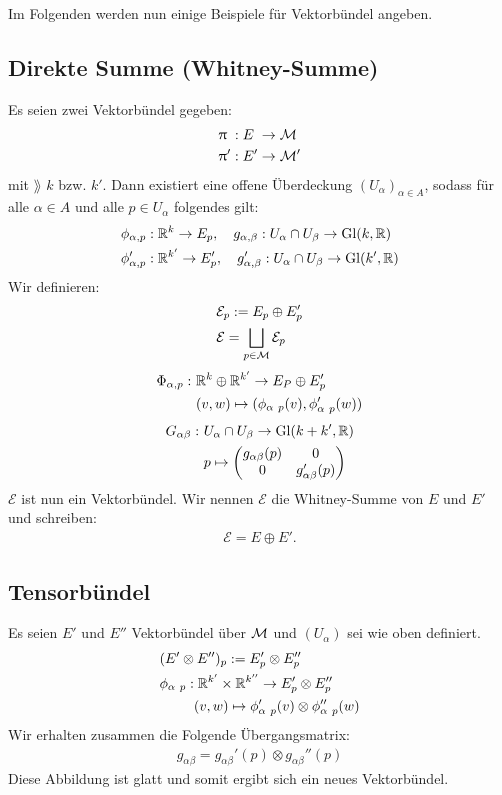 Im Folgenden werden nun einige Beispiele für Vektorbündel angeben.
\subsection{Direkte Summe (Whitney-Summe)}
Es seien zwei Vektorbündel gegeben:
\begin{align*}
\uppi\phantom{'} : E\phantom{'} &\to \mathcal{M}\phantom{'} \\
\uppi ' : E' &\to \mathcal{M} '
\end{align*}
mit $\rang$ $k$ bzw. $k'$. 
Dann existiert eine offene Überdeckung $(U_\alpha)_{\alpha \in A}$, sodass für alle $\alpha \in A$ und alle $p \in U_\alpha$ folgendes gilt:
\begin{align*}
&\phi_{\alpha, p}: \mathbb{R}^k \to E_p, \quad g_{\alpha, \beta}: U_\alpha \cap U_\beta \to \mathrm{Gl}(k, \mathbb{R})\\
&\phi_{\alpha, p}': \mathbb{R}^{k'} \to E_{p}', \quad g_{\alpha, \beta}': U_\alpha \cap U_\beta \to \mathrm{Gl}(k', \mathbb{R})
\end{align*}  
Wir definieren:
\begin{align*}
&\mathcal{E}_p := E_p \oplus E_{p}'\\
&\mathcal{E} = \bigsqcup_{p \in \mathcal{M}} \mathcal{E}_p
\end{align*}
\begin{align*}
\Phi_{\alpha, p}: \ &\mathbb{R}^k \oplus \mathbb{R}^{k'} \to E_P \oplus E_{p}'\\
&(v, w) \mapsto (\phi_{\alpha \ p} (v), \phi_{\alpha \ p}' (w))
\end{align*}
\begin{align*}
G_{\alpha \beta}: \ & U_\alpha \cap U_\beta \to \mathrm{Gl}(k + k', \mathbb{R})\\
&p \mapsto \begin{pmatrix}
g_{\alpha \beta}(p)  & 0 \\ 
0  & g_{\alpha \beta}'(p)
\end{pmatrix} 
\end{align*}
$\mathcal{E}$ ist nun ein Vektorbündel. 
Wir nennen $\mathcal{E}$ die Whitney-Summe von $E$ und $E'$ und schreiben:
\begin{align*}
\mathcal{E} = E \oplus E'.
\end{align*} 

\subsection{Tensorbündel}
Es seien $E'$ und $E''$ Vektorbündel über $\mathcal{M}$ und $(U_\alpha)$ sei wie oben definiert.
\begin{align*}
&(E' \otimes E'')_p := E_{p}'\otimes E_{p}''\\
&\phi_{\alpha \ p} :  \R^{k'} \times \R^{k''} \to E_{p}' \otimes E_{p}''\\
& \phantom{\phi_{\alpha \ p}: }(v, w) \mapsto \phi_{\alpha \ p}'(v) \otimes \phi_{\alpha \ p}'' (w)
\end{align*}
Wir erhalten zusammen die Folgende Übergangsmatrix:
\begin{align}
g_{\alpha \beta} = g_{\alpha \beta}'(p) \otimes g_{\alpha \beta}''(p)
\end{align}
Diese Abbildung ist glatt und somit ergibt sich ein neues Vektorbündel.

